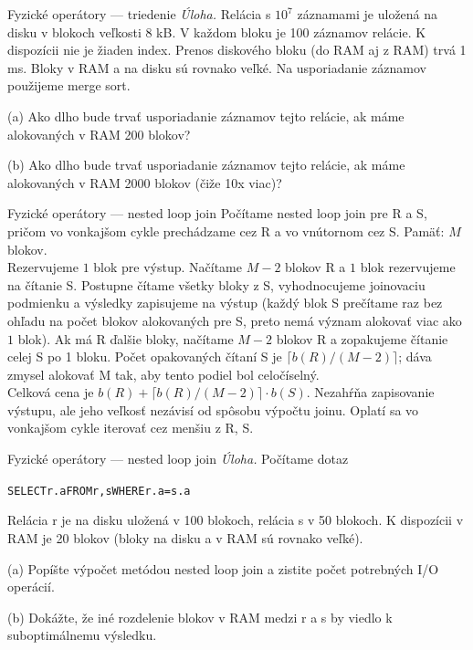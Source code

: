 \documentclass[12pt]{beamer}
\begin{document}
\begin{frame}[fragile]{Fyzické operátory --- triedenie}
\emph{Úloha.}
Relácia s $10^7$ záznamami je uložená na disku v blokoch veľkosti 8 kB.
V každom bloku je 100 záznamov relácie. K dispozícii nie je žiaden index.
Prenos diskového bloku (do RAM aj z RAM) trvá 1 ms.
Bloky v RAM a na disku sú rovnako veľké.
Na usporiadanie záznamov použijeme \alert{merge sort}.

(a) Ako dlho bude trvať usporiadanie záznamov tejto relácie,
ak máme alokovaných v RAM 200 blokov?

(b) Ako dlho bude trvať usporiadanie záznamov tejto relácie,
ak máme alokovaných v RAM 2000 blokov (čiže 10x viac)?
\end{frame}

\begin{frame}[fragile]{Fyzické operátory --- nested loop join}
{\small
Počítame \alert{nested loop join} pre R a S,
pričom vo vonkajšom cykle prechádzame cez R a vo vnútornom cez S.
Pamäť: $M$ blokov.\\[2mm]
Rezervujeme $1$ blok pre výstup.
Načítame $M-2$ blokov R a $1$ blok rezervujeme na čítanie S.
Postupne čítame všetky bloky z S, vyhodnocujeme joinovaciu podmienku a výsledky zapisujeme na výstup
(každý blok S prečítame raz bez ohľadu na počet blokov alokovaných pre S, preto nemá význam alokovať viac ako $1$ blok).
Ak má R ďalšie bloky, načítame $M-2$ blokov R a zopakujeme čítanie celej S po 1 bloku.
Počet opakovaných čítaní S je $\lceil b(R) / (M-2)\rceil$; dáva zmysel alokovať M tak, aby tento podiel bol celočíselný.\\[2mm]
Celková cena je $b(R) + \lceil b(R) / (M-2)\rceil\cdot b(S)$.
Nezahŕňa zapisovanie výstupu, ale jeho veľkosť nezávisí od spôsobu výpočtu joinu.
Oplatí sa vo vonkajšom cykle iterovať cez menšiu z R, S.
}
\end{frame}

\begin{frame}[fragile]{Fyzické operátory --- nested loop join}
\emph{Úloha.}
Počítame dotaz
\begin{alltt}
  SELECT r.a FROM r, s WHERE r.a = s.a
\end{alltt}
Relácia r je na disku uložená v 100 blokoch, relácia s v 50 blokoch.
K dispozícii v RAM je 20 blokov (bloky na disku a v RAM sú rovnako veľké).

(a) Popíšte výpočet metódou \alert{nested loop join}
a zistite počet potrebných I/O operácií.

(b) Dokážte, že iné rozdelenie blokov v RAM medzi r a s by viedlo k suboptimálnemu výsledku.
\end{frame}
\end{document}
